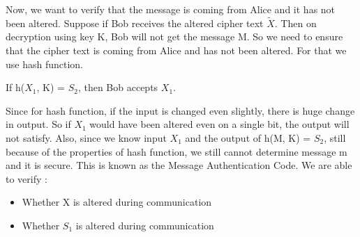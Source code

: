 \documentclass[11pt]{article}
\begin{document}
Now, we want to verify that the message is coming from Alice and it has not been altered. Suppose if Bob receives the altered cipher text
$\tilde{X}$. Then on decryption using key K, Bob will not get the message M. So we need to ensure that the cipher text is coming from Alice and has not been altered. For that we use hash function. \\
\begin{center}
    If h($X_1$, K) = $S_2$, then Bob accepts $X_1$.
\end{center}
Since for hash function, if the input is changed even slightly, there is huge change in output. So if $X_1$ would have been altered even on a single bit, the output will not satisfy. Also, since we know input $X_1$ and the output of h(M, K) = $S_2$, still because of the properties of hash function, we still cannot determine message m and it is secure.
This is known as the Message Authentication Code. We are able to verify :
\begin{itemize}
    \item Whether X is altered during communication
    \item Whether $S_1$ is altered during communication
\end{itemize}
\end{document}
